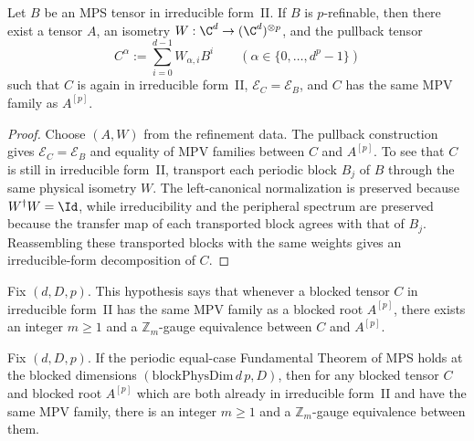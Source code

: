 \begin{theorem}
    \label{thm:p_refinement_pullback_irreducible_form}
    \leanok
    Let $B$ be an MPS tensor in irreducible form~II. If $B$ is
    $p$-refinable, then there exist a tensor $A$, an isometry
    $W : \C^d \to (\C^d)^{\otimes p}$, and the pullback tensor
    $$
        C^{\alpha} := \sum_{i=0}^{d-1} W_{\alpha,i} B^i
        \qquad (\alpha \in \{0,\ldots,d^p-1\})
    $$
    such that $C$ is again in irreducible form~II, $\mathcal E_C = \mathcal E_B$,
    and $C$ has the same MPV family as $A^{[p]}$.
\end{theorem}

\begin{proof}\leanok
    Choose $(A,W)$ from the refinement data. The pullback construction gives
    $\mathcal E_C = \mathcal E_B$ and equality of MPV families between $C$
    and $A^{[p]}$. To see that $C$ is still in irreducible form~II, transport
    each periodic block $B_j$ of $B$ through the same physical isometry $W$.
    The left-canonical normalization is preserved because $W^{\dagger}W = \Id$,
    while irreducibility and the peripheral spectrum are preserved because the
    transfer map of each transported block agrees with that of $B_j$.
    Reassembling these transported blocks with the same weights gives an
    irreducible-form decomposition of $C$.
\end{proof}

\begin{definition}
    \label{def:peripheral_equalcase_zgauge_sameMPV}
    \leanok
    Fix $(d,D,p)$. This hypothesis says that whenever a blocked tensor $C$ in
    irreducible form~II has the same MPV family as a blocked root $A^{[p]}$,
    there exists an integer $m \ge 1$ and a $\mathbb Z_m$-gauge equivalence
    between $C$ and $A^{[p]}$.
\end{definition}

\begin{theorem}
    \label{thm:peripheral_equalcase_zgauge_from_periodic_equalcase_ft}
    \leanok
    Fix $(d,D,p)$. If the periodic equal-case Fundamental Theorem of MPS holds
    at the blocked dimensions $(\text{blockPhysDim}\,d\,p, D)$, then for any
    blocked tensor $C$ and blocked root $A^{[p]}$ which are both already in
    irreducible form~II and have the same MPV family, there is an integer
    $m \ge 1$ and a $\mathbb Z_m$-gauge equivalence between them.
\end{theorem}

